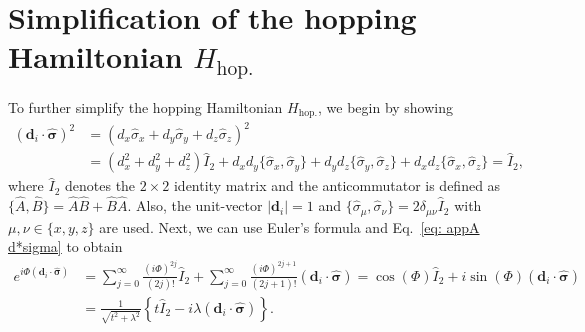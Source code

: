 \section{Simplification of the hopping Hamiltonian $H_\text{hop.}$}
\label{chapter: AppendixA}

To further simplify the hopping Hamiltonian $H_\text{hop.}$, we begin by showing 
\begin{align}
    (\mathbf{d}_i \cdot\bm{\hat{\sigma}})^2 &= (d_x \hat{\sigma}_x + d_y \hat{\sigma}_y + d_z \hat{\sigma}_z)^2 \nonumber\\
    &= (d_x^2 + d_y^2 + d_z^2)\hat{I}_2 + d_xd_y\{\hat{\sigma}_x , \hat{\sigma}_y\} + d_yd_z\{\hat{\sigma}_y , \hat{\sigma}_z\} + d_xd_z\{\hat{\sigma}_x , \hat{\sigma}_z\} = \hat{I}_2
    \label{eq: appA d*sigma},
\end{align}
where $\hat{I}_2$ denotes the $2\times2$ identity matrix and the anticommutator is defined as $\{\hat{A} , \hat{B}\} = \hat{A}\hat{B}+\hat{B}\hat{A}$. Also, the unit-vector $|\mathbf{d}_i| = 1$ and $\{\hat{\sigma}_\mu, \hat{\sigma}_\nu\} = 2\delta_{\mu\nu}\hat{I}_2$ with $\mu,\nu\in\{x,y,z\}$ are used. 
Next, we can use Euler's formula and Eq.~\eqref{eq: appA d*sigma} to obtain
\begin{align}
    e^{i\Phi(\mathbf{d}_i\cdot\bm{\hat{\sigma}})} &= \sum_{j=0}^\infty \frac{(i\Phi)^{2j}}{(2j)!}\hat{I}_2 + \sum_{j=0}^\infty  \frac{(i\Phi)^{2j+1}}{(2j+1)!} (\mathbf{d}_i\cdot\bm{\hat{\sigma}}) = \cos(\Phi)\hat{I}_2 + i \sin(\Phi) (\mathbf{d}_i\cdot\bm{\hat{\sigma}})\nonumber\\
    &= \frac{1}{\sqrt{t^2+ \lambda^2}}\left\{t\hat{I}_2 - i\lambda (\bm{d}_i \cdot \bm{\hat{\sigma}}) \right\}.
    \label{eq: hamilton exp}
\end{align}

